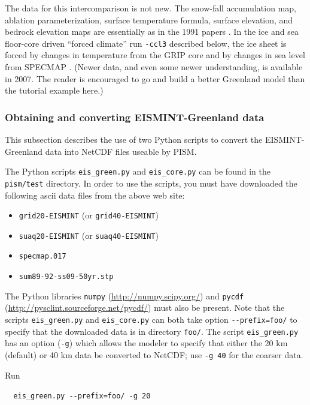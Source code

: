 \documentclass[11pt,final]{amsart}
\begin{document}
\centerline{}
\medskip

The data for this intercomparison is not new.  The snow-fall accumulation map, ablation parameterization, surface temperature formula, surface elevation, and bedrock elevation maps are essentially as in the 1991 papers \cite{Letreguillyetal1991,OhmuraReeh}.  In the ice and sea floor-core driven ``forced climate'' run \verb|-ccl3| described below, the ice sheet is forced by changes in temperature from the GRIP core \cite{Dansgaardetal1993} and by changes in sea level from SPECMAP \cite{Imbrieetal1984}.  (Newer data, and even some newer understanding, is available in 2007.  The reader is encouraged to go and build a better Greenland model than the tutorial example here.)

\subsubsection{Obtaining and converting EISMINT-Greenland data}  This subsection describes the use of two Python scripts to convert the EISMINT-Greenland data into NetCDF files useable by PISM.

The Python scripts \verb|eis_green.py| and \verb|eis_core.py| can be found in the \verb|pism/test| directory.  In order to use the scripts, you must have downloaded the following ascii data files from the above web site:\begin{itemize}
 \item \verb|grid20-EISMINT| (or \verb|grid40-EISMINT|)
 \item \verb|suaq20-EISMINT| (or \verb|suaq40-EISMINT|)
 \item \verb|specmap.017|
 \item \verb|sum89-92-ss09-50yr.stp|
\end{itemize}
The Python libraries \verb|numpy| (\url{http://numpy.scipy.org/}) and \verb|pycdf| (\url{http://pysclint.sourceforge.net/pycdf/}) must also be present.  Note that the scripts \verb|eis_green.py| and \verb|eis_core.py| can both take option \verb|--prefix=foo/| to specify that the downloaded data is in directory \verb|foo/|.  The script \verb|eis_green.py| has an option (\verb|-g|) which allows the modeler to specify that either the 20 km (default) or 40 km data be converted to NetCDF; use \verb|-g 40| for the coarser data.

Run

\verb|  eis_green.py --prefix=foo/ -g 20|
\end{document}
